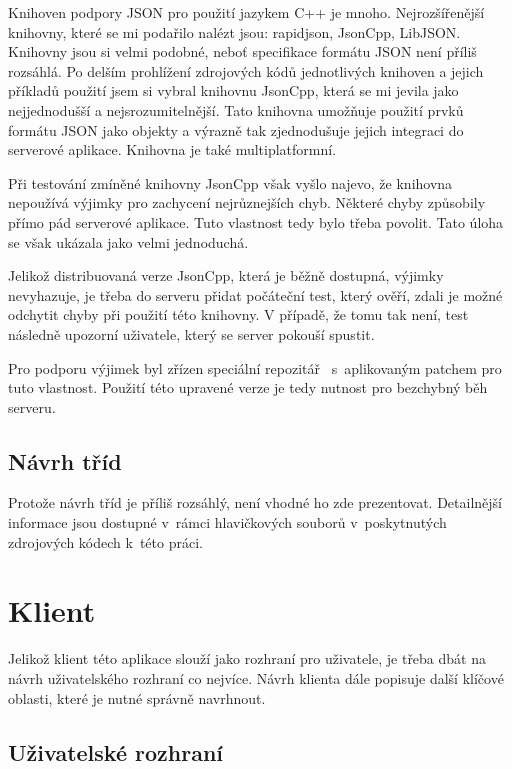 \documentclass[thesis=B,czech]{FITthesis}[2013/10/20]
\begin{document}
Knihoven podpory JSON pro použití jazykem C++ je mnoho. Nejrozšířenější knihovny, které se mi podařilo nalézt jsou: rapidjson, JsonCpp, LibJSON. Knihovny jsou si velmi podobné, neboť specifikace formátu JSON není příliš rozsáhlá. Po delším prohlížení zdrojových kódů jednotlivých knihoven a jejich příkladů použití jsem si vybral knihovnu JsonCpp, která se mi jevila jako nejjednodušší a nejsrozumitelnější. Tato knihovna umožňuje použití prvků formátu JSON jako objekty a výrazně tak zjednodušuje jejich integraci do serverové aplikace. Knihovna je také multiplatformní.

Při testování zmíněné knihovny JsonCpp však vyšlo najevo, že knihovna nepoužívá výjimky pro zachycení nejrůznejších chyb. Některé chyby způsobily přímo pád serverové aplikace. Tuto vlastnost tedy bylo třeba povolit. Tato úloha se však ukázala jako velmi jednoduchá.

Jelikož distribuovaná verze JsonCpp, která je běžně dostupná, výjimky nevyhazuje, je třeba do serveru přidat počáteční test, který ověří, zdali je možné odchytit chyby při použití této knihovny. V případě, že tomu tak není, test následně upozorní uživatele, který se server pokouší spustit.

Pro podporu výjimek byl zřízen speciální repozitář~\cite{json_ex_repo} s~aplikovaným patchem pro tuto vlastnost. Použití této upravené verze je tedy nutnost pro bezchybný běh serveru.

\subsection{Návrh tříd}

Protože návrh tříd je příliš rozsáhlý, není vhodné ho zde prezentovat. Detailnější informace jsou dostupné v~rámci hlavičkových souborů v~poskytnutých zdrojových kódech k~této práci.

\section{Klient}

Jelikož klient této aplikace slouží jako rozhraní pro uživatele, je třeba dbát na návrh uživatelského rozhraní co nejvíce. Návrh klienta dále popisuje další klíčové oblasti, které je nutné správně navrhnout.

\subsection{Uživatelské rozhraní}
\end{document}
